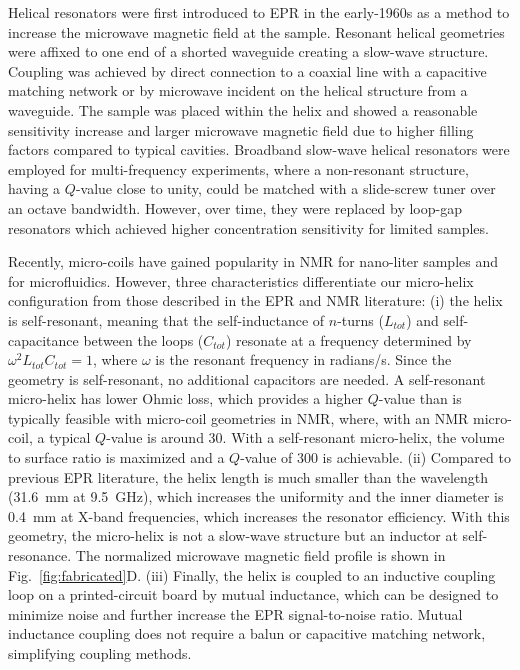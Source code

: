 Helical resonators were first introduced to EPR in the early-1960s as a method to increase the microwave magnetic field at the sample. Resonant helical geometries were affixed to one end of a shorted waveguide creating a slow-wave structure. \cite{Webb1962, Helix1967} Coupling was achieved by direct connection to a coaxial line with a capacitive matching network or by microwave incident on the helical structure from a waveguide. The sample was placed within the helix and showed a reasonable sensitivity increase and larger microwave magnetic field due to higher filling factors compared to typical cavities. \cite{Nolle1966} Broadband slow-wave helical resonators were employed for multi-frequency experiments, where a non-resonant structure, having a $Q$-value close to unity, could be matched with a slide-screw tuner over an octave bandwidth. \cite{nonresonant1986} However, over time, they were replaced by loop-gap resonators which achieved higher concentration sensitivity for limited samples. \cite{froncisz1982loop}

Recently, micro-coils have gained popularity in NMR for nano-liter samples \cite{Olson1967, SUBRAMANIAN1998227, cr980140f,Kentgens2008,Raluca2011,Jones2012} and for microfluidics. \cite{Mompean2018} However, three characteristics differentiate our micro-helix configuration from those described in the EPR \cite{Webb1962, Helix1967, oldmicro} and NMR literature\cite{WEBB2005892}: (i) the helix is self-resonant, meaning that the self-inductance of $n$-turns ($L_{tot}$) and self-capacitance between the loops ($C_{tot}$) resonate at a frequency determined by $\omega^2 L_{tot}C_{tot}=1$, where $\omega$ is the resonant frequency in radians/s. Since the geometry is self-resonant, no additional capacitors are needed. A self-resonant micro-helix has lower Ohmic loss, which provides a higher $Q$-value than is typically feasible with micro-coil geometries in NMR, where, with an NMR micro-coil, a typical $Q$-value is around 30. \cite{WEBB2005892} With a self-resonant micro-helix, the volume to surface ratio is maximized and a $Q$-value of 300 is achievable. (ii) Compared to previous EPR literature, the helix length is much smaller than the wavelength (31.6~mm at 9.5~GHz), which increases the uniformity and the inner diameter is 0.4~mm at X-band frequencies, which increases the resonator efficiency. With this geometry, the micro-helix is not a slow-wave structure but an inductor at self-resonance. The normalized microwave magnetic field profile is shown in Fig.~\ref{fig:fabricated}D. (iii) Finally, the helix is coupled to an inductive coupling loop on a printed-circuit board by mutual inductance, which can be designed to minimize noise and further increase the EPR signal-to-noise ratio. \cite{coupling2016} Mutual inductance coupling does not require a balun or capacitive matching network, simplifying coupling methods.

